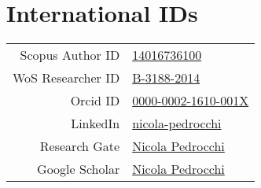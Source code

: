 \documentclass[a4paper,9pt]{extarticle}
\begin{document}
\section*{International IDs}
\begin{tabularx}{\textwidth}{rX}
Scopus Author ID	&  \href{https://www.scopus.com/authid/detail.uri\?authorId=14016736100}{14016736100}\\
WoS Researcher ID	& \href{https://www.webofscience.com/}{B-3188-2014}\\
Orcid ID	& \href{https://orcid.org/0000-0002-1610-001X}{0000-0002-1610-001X}\\
LinkedIn  &	\href{https://www.linkedin.com/in/nicola-pedrocchi/}{nicola-pedrocchi} \\
Research Gate	& \href{https://www.researchgate.net/profile/Nicola\_Pedrocchi}{Nicola Pedrocchi}  \\
Google Scholar	& \href{https://scholar.google.com/citations?user=UpiG-f8AAAAJ\&hl=en}{Nicola Pedrocchi}\\
\end{tabularx}
\end{document}
